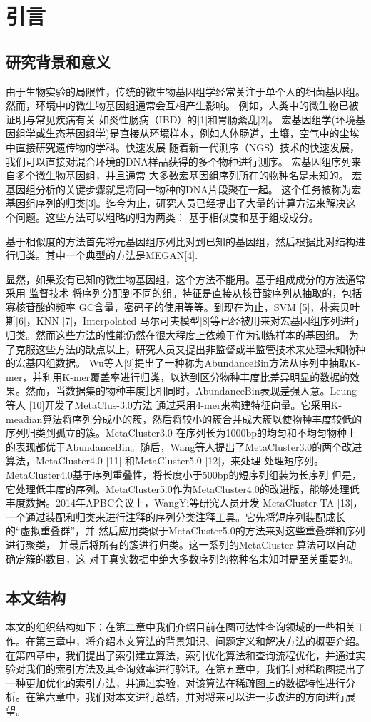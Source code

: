 ﻿\chapter{引言}
\section{研究背景和意义}

由于生物实验的局限性，传统的微生物基因组学经常关注于单个人的细菌基因组。然而，环境中的微生物基因组通常会互相产生影响。
例如，人类中的微生物已被证明与常见疾病有关
如炎性肠病（IBD）的[1]和胃肠紊乱[2]。
宏基因组学(环境基因组学或生态基因组学)是直接从环境样本，例如人体肠道，土壤，空气中的尘埃中直接研究遗传物的学科。快速发展
随着新一代测序（NGS）技术的快速发展，我们可以直接对混合环境的DNA样品获得的多个物种进行测序。
宏基因组序列来自多个微生物基因组，并且通常
大多数宏基因组序列所在的物种名是未知的。
宏基因组分析的关键步骤就是将同一物种的DNA片段聚在一起。
这个任务被称为宏基因组序列的归类[3]。迄今为止，研究人员已经提出了大量的计算方法来解决这个问题。这些方法可以粗略的归为两类：
基于相似度和基于组成成分。

基于相似度的方法首先将元基因组序列比对到已知的基因组，然后根据比对结构进行归类。其中一个典型的方法是MEGAN[4].

显然，如果没有已知的微生物基因组，这个方法不能用。基于组成成分的方法通常采用
监督技术 将序列分配到不同的组。特征是直接从核苷酸序列从抽取的，包括寡核苷酸的频率
GC含量，密码子的使用等等。到现在为止，SVM [5]，朴素贝叶斯[6]，KNN [7]，Interpolated 马尔可夫模型[8]等已经被用来对宏基因组序列进行归类。然而这些方法的性能仍然在很大程度上依赖于作为训练样本的基因组。
为了克服这些方法的缺点以上，研究人员又提出非监督或半监管技术来处理未知物种的宏基因组数据。 Wu等人[9]提出了一种称为AbundanceBin方法从序列中抽取K-mer，并利用K-mer覆盖率进行归类，以达到区分物种丰度比差异明显的数据的效果。然而，当数据集的物种丰度比相同时，AbundanceBin表现差强人意。Leung等人 [10]开发了MetaClus-3.0方法
通过采用4-mer来构建特征向量。它采用K-meadian算法将序列分成小的簇，然后将较小的簇合并成大簇以使物种丰度较低的序列归类到孤立的簇。MetaCluster3.0 在序列长为1000bp的均匀和不均匀物种上的表现都优于AbundanceBin。随后，Wang等人提出了MetaCluster3.0的两个改进算法，MetaCluster4.0 [11] 和MetaCluster5.0 [12]，来处理
处理短序列。MetaCluster4.0基于序列重叠性，将长度小于500bp的短序列组装为长序列
但是，它处理低丰度的序列。MetaCluster5.0作为MetaCluster4.0的改进版，能够处理低丰度数据。2014年APBC会议上，WangYi等研究人员开发
MetaCluster-TA [13]，一个通过装配和归类来进行注释的序列分类注释工具。它先将短序列装配成长的“虚拟重叠群”，并
然后应用类似于MetaCluster5.0的方法来对这些重叠群和序列进行聚类，
并最后将所有的簇进行归类。这一系列的MetaCluster
算法可以自动确定簇的数目，这
对于真实数据中绝大多数序列的物种名未知时是至关重要的。



\section{本文结构}
本文的组织结构如下：在第二章中我们介绍目前在图可达性查询领域的一些相关工作。在第三章中，将介绍本文算法的背景知识、问题定义和解决方法的概要介绍。在第四章中，我们提出了\pphop 索引建立算法，索引优化算法和查询流程优化，并通过实验对我们的索引方法及其查询效率进行验证。在第五章中，我们针对稀疏图提出了一种更加优化的\ppmuihop 索引方法，并通过实验，对该算法在稀疏图上的数据特性进行分析。在第六章中，我们对本文进行总结，并对将来可以进一步改进的方向进行展望。
